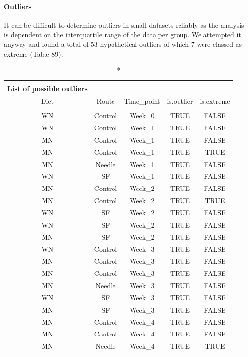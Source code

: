\documentclass[
  12pt,
  letterpaper,
]{article}
\begin{document}
\paragraph{Outliers}\label{outliers-2}

It can be difficult to determine outliers in small datasets reliably as the analysis is dependent on the interquartile range of the data per group. We attempted it anyway and found a total of 53 hypothetical outliers of which 7 were classed as extreme (Table 89).

\begin{longtable}{ccccc}
\caption*{
{\large \textbf{Appendix Table 89}} \\ 
{\small \textbf{List of possible outliers}}
} \\ 
\toprule
Diet & Route & Time\_point & is.outlier & is.extreme \\ 
\midrule\addlinespace[2.5pt]
\multicolumn{5}{l}{Pre-Infection} \\ 
\midrule\addlinespace[2.5pt]
WN & Control & Week\_0 & TRUE & FALSE \\ 
WN & Control & Week\_1 & TRUE & FALSE \\ 
MN & Control & Week\_1 & TRUE & FALSE \\ 
MN & Control & Week\_1 & TRUE & TRUE \\ 
MN & Needle & Week\_1 & TRUE & FALSE \\ 
WN & SF & Week\_1 & TRUE & FALSE \\ 
MN & Control & Week\_2 & TRUE & FALSE \\ 
MN & Control & Week\_2 & TRUE & TRUE \\ 
WN & SF & Week\_2 & TRUE & FALSE \\ 
WN & SF & Week\_2 & TRUE & FALSE \\ 
MN & SF & Week\_2 & TRUE & FALSE \\ 
WN & Control & Week\_3 & TRUE & FALSE \\ 
MN & Control & Week\_3 & TRUE & FALSE \\ 
MN & Control & Week\_3 & TRUE & FALSE \\ 
MN & Needle & Week\_3 & TRUE & FALSE \\ 
WN & SF & Week\_3 & TRUE & FALSE \\ 
MN & SF & Week\_3 & TRUE & FALSE \\ 
MN & Control & Week\_4 & TRUE & FALSE \\ 
MN & Control & Week\_4 & TRUE & FALSE \\ 
MN & Needle & Week\_4 & TRUE & TRUE \\ 

\end{longtable}
\end{document}
